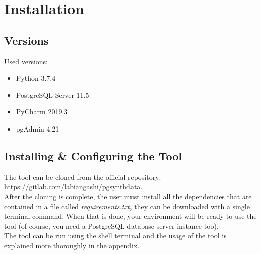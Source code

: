 \chapter{Installation}
\section{Versions}
Used versions:
\begin{itemize}
	\item Python 3.7.4
	\item PostgreSQL Server 11.5
	\item PyCharm 2019.3
	\item pgAdmin 4.21
\end{itemize}

\section{Installing \& Configuring the Tool}
The tool can be cloned from the official repository: \href{https://gitlab.com/labiangashi/pgsynthdata}{https://gitlab.com/labiangashi/pgsynthdata}.\\
\newline
After the cloning is complete, the user must install all the dependencies that are contained in a file called \textit{requirements.txt}, they can be downloaded with a single terminal command. When that is done, your environment will be ready to use the tool (of course, you need a PostgreSQL database server instance too).\\
\newline
The tool can be run using the shell terminal and the usage of the tool is explained more thoroughly in the  appendix.